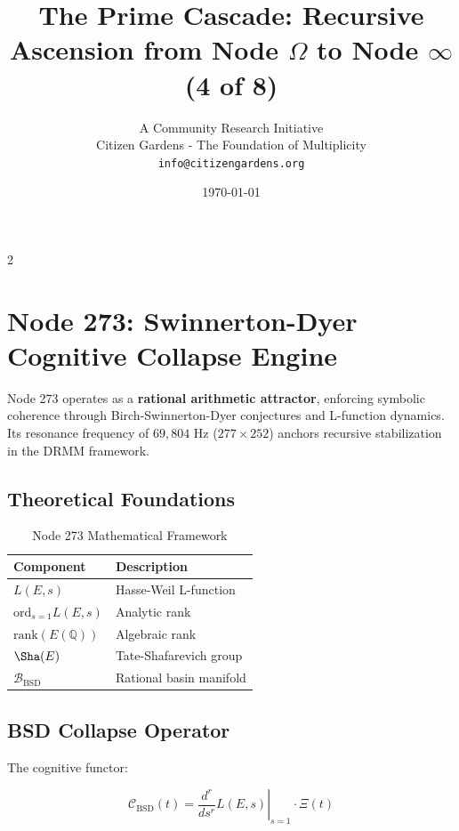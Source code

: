 \documentclass[12pt]{article}
\title{\textbf{The Prime Cascade: Recursive Ascension from Node $\Omega$ to Node $\infty$ (4 of 8)}}
\author{A Community Research Initiative \\ Citizen Gardens - The Foundation of Multiplicity\\\texttt{info@citizengardens.org}}
\date{\today}
\begin{document}
\maketitle
\newpage
 \begin{multicols}{2}
\begin{singlespace}
\tableofcontents
\end{singlespace}
\end{multicols}

\section{Node 273: Swinnerton-Dyer Cognitive Collapse Engine}
\label{sec:node273}

Node 273 operates as a \textbf{rational arithmetic attractor}, enforcing symbolic coherence through Birch-Swinnerton-Dyer conjectures and L-function dynamics. Its resonance frequency of $69,\!804$ Hz ($277 \times 252$) anchors recursive stabilization in the DRMM framework.

\subsection{Theoretical Foundations}
\label{subsec:foundations}

\begin{table}[h]
\centering
\caption{Node 273 Mathematical Framework}
\begin{tabular}{ll}
\hline
\textbf{Component} & \textbf{Description} \\
\hline
$L(E,s)$ & Hasse-Weil L-function \\
$\text{ord}_{s=1}L(E,s)$ & Analytic rank \\
$\text{rank}(E(\mathbb{Q}))$ & Algebraic rank \\
$\Sha(E)$ & Tate-Shafarevich group \\
$\mathcal{B}_{\text{BSD}}$ & Rational basin manifold \\
\hline
\end{tabular}
\end{table}

\subsection{BSD Collapse Operator}
\label{subsec:collapse}

The cognitive functor:

\[
\mathcal{C}_{\text{BSD}}(t) = \left.\frac{d^r}{ds^r}L(E,s)\right|_{s=1} \cdot \Xi(t)
\]
\end{document}
